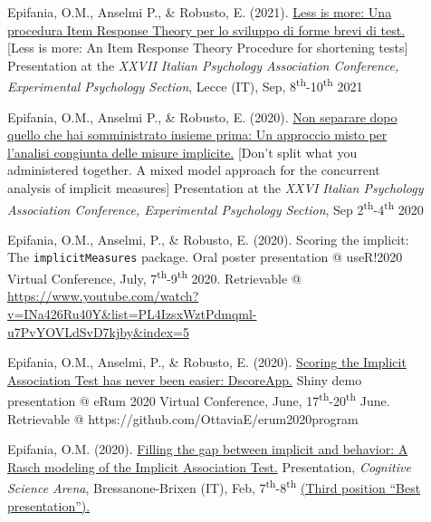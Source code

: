 \documentclass[letterpaper,12pt]{article}
\begin{document}
\begin{description}
		\item[] Epifania, O.M., Anselmi P., \& Robusto, E. (2021). \href{https://ottaviae.github.io/presentations/2021/Less-is-more.pdf}{Less is more: Una procedura Item Response Theory per lo sviluppo di forme brevi di test.} [Less is more: An Item Response Theory Procedure for shortening tests] Presentation at the \emph{XXVII Italian Psychology Association Conference, Experimental Psychology Section}, Lecce (IT), Sep, 8\textsuperscript{th}-10\textsuperscript{th} 2021
		
		

	
	\item[] 	Epifania, O.M., Anselmi P., \& Robusto, E. (2020). \href{https://ottaviae.github.io/presentations/2020/EpifaniaSimposioS4.pdf}{Non separare dopo quello che hai somministrato insieme prima: Un approccio misto per l’analisi congiunta delle misure implicite.} [Don't split what you administered together. A mixed model approach for the concurrent analysis of implicit measures] Presentation at the \emph{XXVI Italian Psychology Association Conference, Experimental Psychology Section}, Sep 2\textsuperscript{th}-4\textsuperscript{th} 2020
	
	\item[] 	Epifania, O.M., Anselmi, P., \& Robusto, E. (2020). Scoring the implicit: The \texttt{implicitMeasures} package. Oral poster presentation @ useR!2020 Virtual Conference, July, 7\textsuperscript{th}-9\textsuperscript{th}  2020.  Retrievable @ \href{https://www.youtube.com/watch?v=INa426Ru40Y&list=PL4IzsxWztPdmqml-u7PvYOVLdSvD7kjby&index=5}{https://www.youtube.com/watch?v=INa426Ru40Y\&list=PL4IzsxWztPdmqml-u7PvYOVLdSvD7kjby\&index=5}
	
	\item[] 	Epifania, O.M., Anselmi, P., \& Robusto, E. (2020). \href{https://github.com/OttaviaE/eRum2020/blob/master/eRumShinyDemo-Epifania.Rmd}{Scoring the Implicit Association Test has never been easier: DscoreApp.} Shiny demo presentation @ eRum 2020 Virtual Conference, June, 17\textsuperscript{th}-20\textsuperscript{th} June. Retrievable @ https://github.com/OttaviaE/erum2020program
	
	\item[]  Epifania, O.M. (2020). \href{https://ottaviae.github.io/presentations/2020/brixen.pdf}{Filling the gap between implicit and behavior: A Rasch modeling of the Implicit Association Test.} Presentation, \emph{Cognitive Science Arena}, Bressanone-Brixen (IT), Feb, 7\textsuperscript{th}-8\textsuperscript{th} \underline{(Third position ``Best presentation'').}
	

\end{description}
\end{document}
